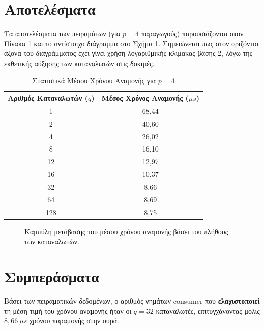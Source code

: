 \documentclass[11pt,a4paper]{article}
\begin{document}
\section{Αποτελέσματα}
Τα αποτελέσματα των πειραμάτων (για $p=4$ παραγωγούς) παρουσιάζονται στον Πίνακα \ref{tab:wait_times} και το αντίστοιχο διάγραμμα στο Σχήμα \ref{fig:wait_curve}. Σημειώνεται πως στον οριζόντιο άξονα του διαγράμματος έχει γίνει χρήση λογαριθμικής κλίμακας βάσης 2, λόγω της εκθετικής αύξησης των καταναλωτών στις δοκιμές.

\begin{table}[H]
\centering
\begin{tabular}{@{}cc@{}}
\toprule
\textbf{Αριθμός Καταναλωτών ($q$)} & \textbf{Μέσος Χρόνος Αναμονής ($\mu s$)} \\ \midrule
1 & 68,44 \\
2 & 40,60 \\
4 & 26,02 \\
8 & 16,10 \\
12 & 12,97 \\
16 & 10,37 \\
32 & 8,66 \\
64 & 8,69 \\
128 & 8,75 \\ \bottomrule
\end{tabular}
\caption{Στατιστικά Μέσου Χρόνου Αναμονής για $p=4$}
\label{tab:wait_times}
\end{table}

\begin{figure}[H]
\centering
{}
\caption{Καμπύλη μετάβασης του μέσου χρόνου αναμονής βάσει του πλήθους των καταναλωτών.}
\label{fig:wait_curve}
\end{figure}

\section{Συμπεράσματα}
Βάσει των πειραματικών δεδομένων, ο αριθμός νημάτων consumer που \textbf{ελαχιστοποιεί} τη μέση τιμή του χρόνου αναμονής ήταν οι \textbf{$q = 32$} καταναλωτές, επιτυγχάνοντας μόλις $8,66\ \mu s$ χρόνου παραμονής στην ουρά. 
\end{document}
